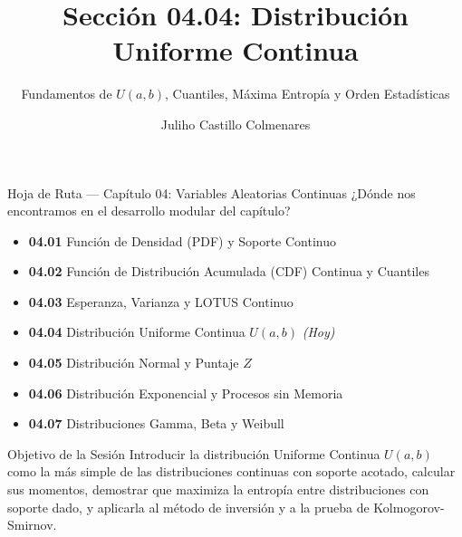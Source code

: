 \documentclass[10pt, aspectratio=169]{beamer}
\title[Distribución Uniforme]{Sección 04.04: Distribución Uniforme Continua}
\subtitle{Fundamentos de $U(a, b)$, Cuantiles, Máxima Entropía y Orden Estadísticas}
\author[J. Castillo Colmenares]{Juliho Castillo Colmenares}
\institute{Tecnológico de Monterrey}
\date{\vspace{-1.2cm}}
\begin{document}
\begin{frame}[plain]
  \vspace{-0.8cm}
  \titlepage
\end{frame}

\begin{frame}{Hoja de Ruta --- Capítulo 04: Variables Aleatorias Continuas}
  \footnotesize
  ¿Dónde nos encontramos en el desarrollo modular del capítulo? \pause
  \begin{itemize}\itemsep=0.08em
    \item \textbf{04.01} Función de Densidad (PDF) y Soporte Continuo \pause
    \item \textbf{04.02} Función de Distribución Acumulada (CDF) Continua y Cuantiles \pause
    \item \textbf{04.03} Esperanza, Varianza y LOTUS Continuo \pause
    \item \textbf{04.04} Distribución Uniforme Continua $U(a, b)$ \emph{(Hoy)} \pause
    \item \textbf{04.05} Distribución Normal y Puntaje $Z$ \pause
    \item \textbf{04.06} Distribución Exponencial y Procesos sin Memoria \pause
    \item \textbf{04.07} Distribuciones Gamma, Beta y Weibull
  \end{itemize}
  \vspace{-0.05cm}
  \begin{block}{Objetivo de la Sesión}
    Introducir la distribución Uniforme Continua $U(a, b)$ como la más simple de las distribuciones continuas con soporte acotado, calcular sus momentos, demostrar que maximiza la entropía entre distribuciones con soporte dado, y aplicarla al método de inversión y a la prueba de Kolmogorov-Smirnov.
  \end{block}
\end{frame}
\end{document}
